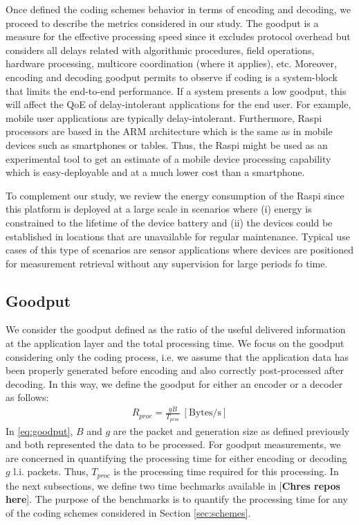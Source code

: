 \label{sec:metrics}

Once defined the coding schemes behavior in terms of encoding
and decoding, we proceed to describe the metrics considered in our study.
The goodput is a measure for the effective processing speed since it
excludes protocol overhead but considers all delays related with
algorithmic procedures, field operations, hardware processing, multicore
coordination (where it applies), etc. Moreover, encoding and decoding
goodput permits to observe if coding is a system-block that limits the
end-to-end performance. If a system presents a low goodput, this will
affect the \ac{QoE} of delay-intolerant applications for the end user.
For example, mobile user applications are typically delay-intolerant.
Furthermore, \ac{Raspi} processors are based in the \ac{ARM} architecture
which is the same as in mobile devices such as smartphones or tables.
Thus, the \ac{Raspi} might be used as an experimental tool to get an
estimate of a mobile device processing capability which is easy-deployable
and at a much lower cost than a smartphone.

To complement our study, we review the energy consumption of the \ac{Raspi}
since this platform is deployed at a large scale in scenarios where (i)
energy is constrained to the lifetime of the device battery and (ii) the
devices could be established in locations that are unavailable for
regular maintenance. Typical use cases of this type of scenarios are
sensor applications where devices are positioned for measurement retrieval
without any supervision for large periods fo time.

\subsection{Goodput}
We consider the goodput defined as the ratio of the useful delivered
information at the application layer and the total processing time. We focus
on the goodput considering only the coding process, i.e. we assume that
the application data has been properly generated before encoding and
also correctly post-processed after decoding. In this way, we define
the goodput for either an encoder or a decoder as follows:
%
\begin{align} \label{eq:goodput}
R_{proc} = \frac{gB}{T_{proc}} ~ [\mathrm{Bytes/s}]
\end{align}
%
In \eqref{eq:goodput}, $B$ and $g$ are the packet and generation size
as defined previously and both represented the data to be processed. For
goodput measurements, we are concerned in quantifying the processing time
for either encoding or decoding $g$ \ac{l.i.} packets. Thus, $T_{proc}$ is
the processing time required for this processing. In the next subsections, we
define two time bechmarks available in [\textbf{Chres repos here}].
The purpose of the benchmarks is to quantify the processing time for
any of the coding schemes considered in Section \ref{sec:schemes}.

